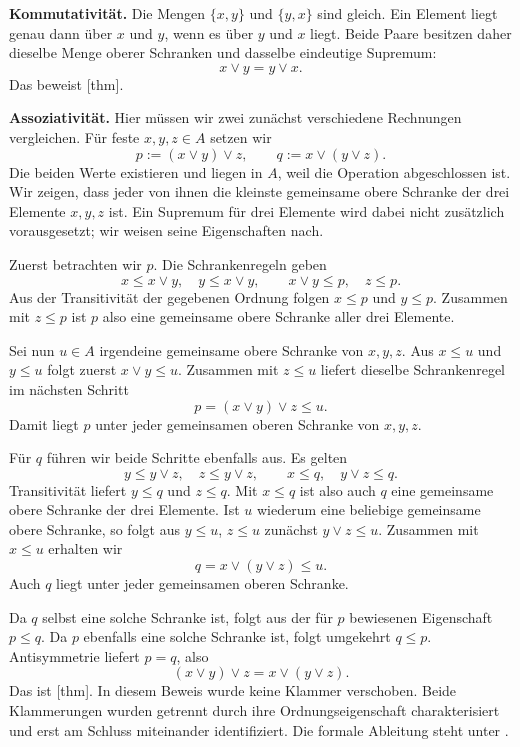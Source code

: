 \medskip\noindent\textbf{Kommutativität.}
Die Mengen \(\{x,y\}\) und \(\{y,x\}\) sind gleich.
Ein Element liegt genau dann über \(x\) und \(y\), wenn
es über \(y\) und \(x\) liegt. Beide Paare besitzen daher
dieselbe Menge oberer Schranken und dasselbe eindeutige Supremum:
\[
  x\vee y=y\vee x.
\]
Das beweist [thm].

\medskip\noindent\textbf{Assoziativität.}
Hier müssen wir zwei zunächst verschiedene Rechnungen vergleichen.
Für feste \(x,y,z\in A\) setzen wir
\[
  p:=(x\vee y)\vee z,\qquad q:=x\vee(y\vee z).
\]
Die beiden Werte existieren und liegen in \(A\), weil die
Operation abgeschlossen ist. Wir zeigen, dass jeder von ihnen
die kleinste gemeinsame obere Schranke der drei Elemente
\(x,y,z\) ist. Ein Supremum für drei Elemente wird dabei
nicht zusätzlich vorausgesetzt; wir weisen seine Eigenschaften nach.

Zuerst betrachten wir \(p\). Die Schrankenregeln geben
\[
  x\leq x\vee y,\quad y\leq x\vee y,\qquad
  x\vee y\leq p,\quad z\leq p.
\]
Aus der Transitivität der gegebenen Ordnung folgen
\(x\leq p\) und \(y\leq p\). Zusammen mit \(z\leq p\)
ist \(p\) also eine gemeinsame obere Schranke aller drei Elemente.

Sei nun \(u\in A\) irgendeine gemeinsame obere Schranke von
\(x,y,z\). Aus \(x\leq u\) und \(y\leq u\) folgt
zuerst \(x\vee y\leq u\). Zusammen mit \(z\leq u\)
liefert dieselbe Schrankenregel im nächsten Schritt
\[
  p=(x\vee y)\vee z\leq u.
\]
Damit liegt \(p\) unter jeder gemeinsamen oberen Schranke
von \(x,y,z\).

Für \(q\) führen wir beide Schritte ebenfalls aus.
Es gelten
\[
  y\leq y\vee z,\quad z\leq y\vee z,\qquad
  x\leq q,\quad y\vee z\leq q.
\]
Transitivität liefert \(y\leq q\) und \(z\leq q\).
Mit \(x\leq q\) ist also auch \(q\) eine gemeinsame
obere Schranke der drei Elemente. Ist \(u\) wiederum eine
beliebige gemeinsame obere Schranke, so folgt aus
\(y\leq u\), \(z\leq u\) zunächst \(y\vee z\leq u\).
Zusammen mit \(x\leq u\) erhalten wir
\[
  q=x\vee(y\vee z)\leq u.
\]
Auch \(q\) liegt unter jeder gemeinsamen oberen Schranke.

Da \(q\) selbst eine solche Schranke ist, folgt aus der für
\(p\) bewiesenen Eigenschaft \(p\leq q\). Da \(p\)
ebenfalls eine solche Schranke ist, folgt umgekehrt \(q\leq p\).
Antisymmetrie liefert \(p=q\), also
\[
  (x\vee y)\vee z=x\vee(y\vee z).
\]
Das ist [thm]. In diesem
Beweis wurde keine Klammer verschoben. Beide Klammerungen wurden
getrennt durch ihre Ordnungseigenschaft charakterisiert und erst
am Schluss miteinander identifiziert. Die formale Ableitung steht
unter .

